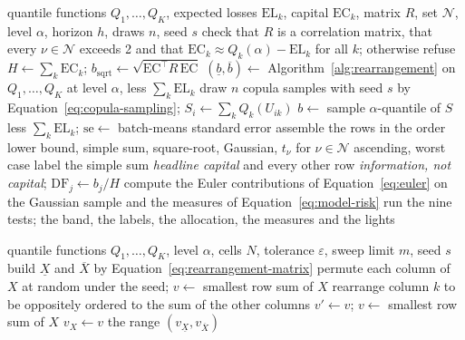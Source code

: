 \begin{algorithm}[htbp]
\caption{The dependence band of an aggregate.}
\label{alg:band}
\begin{algorithmic}[1]
\Require quantile functions $Q_1,\dots,Q_K$, expected losses $\mathrm{EL}_k$, capital $\mathrm{EC}_k$, matrix $R$, set $\mathcal N$, level $\alpha$, horizon $h$, draws $n$, seed $s$
\State check that $R$ is a correlation matrix, that every $\nu\in\mathcal N$ exceeds 2 and that $\mathrm{EC}_k\approx Q_k(\alpha)-\mathrm{EL}_k$ for all $k$; otherwise refuse
\State $H\gets\sum_k\mathrm{EC}_k$; $b_{\mathrm{sqrt}}\gets\sqrt{\mathrm{EC}^\top R\,\mathrm{EC}}$
\State $(\underline b,\overline b)\gets$ Algorithm~\ref{alg:rearrangement} on $Q_1,\dots,Q_K$ at level $\alpha$, less $\sum_k\mathrm{EL}_k$
\State draw $n$ copula samples with seed $s$ by Equation~\ref{eq:copula-sampling}; $S_i\gets\sum_kQ_k(U_{ik})$
\State $b\gets$ sample $\alpha$-quantile of $S$ less $\sum_k\mathrm{EL}_k$; $\mathrm{se}\gets$ batch-means standard error
\EndFor
\State assemble the rows in the order lower bound, simple sum, square-root, Gaussian, $t_\nu$ for $\nu\in\mathcal N$ ascending, worst case
\State label the simple sum \emph{headline capital} and every other row \emph{information, not capital}; $\mathrm{DF}_j\gets b_j/H$
\State compute the Euler contributions of Equation~\ref{eq:euler} on the Gaussian sample and the measures of Equation~\ref{eq:model-risk}
\State run the nine tests; \Return the band, the labels, the allocation, the measures and the lights
\end{algorithmic}
\end{algorithm}

\begin{algorithm}[htbp]
\caption{Rearrangement range of the worst value at risk (upper end).}
\label{alg:rearrangement}
\begin{algorithmic}[1]
\Require quantile functions $Q_1,\dots,Q_K$, level $\alpha$, cells $N$, tolerance $\varepsilon$, sweep limit $m$, seed $s$
\State build $\underline X$ and $\overline X$ by Equation~\ref{eq:rearrangement-matrix}
\State permute each column of $X$ at random under the seed; $v\gets$ smallest row sum of $X$
\Repeat
{}
\State rearrange column $k$ to be oppositely ordered to the sum of the other columns
\EndFor
\State $v'\gets v$; $v\gets$ smallest row sum of $X$
\State $v_X\gets v$
\EndFor
\State \Return the range $(v_{\underline X},v_{\overline X})$
\end{algorithmic}
\end{algorithm}

